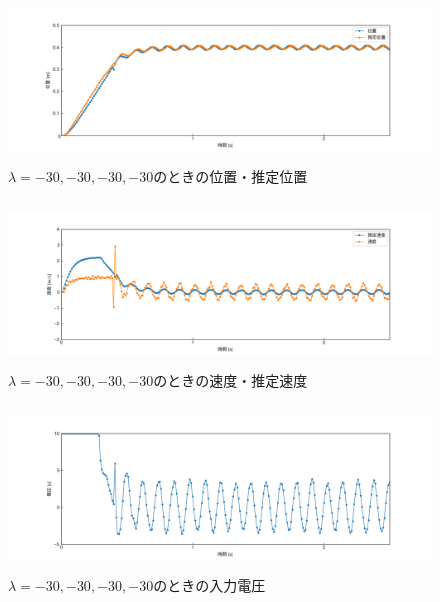 \documentclass[12pt]{jsarticle}
\begin{document}
\begin{figure}[H]
  \begin{center}
    \includegraphics[clip,width=13.0cm, height=4.4cm]{../img/Exp4-1.png}
    \caption{$\lambda=-30, -30, -30, -30$のときの位置・推定位置}
    \label{Exp4-1}
  \end{center}
\end{figure}
\begin{figure}[H]
  \begin{center}
    \includegraphics[clip,width=13.0cm, height=4.4cm]{../img/Exp4-2.png}
    \caption{$\lambda=-30, -30, -30, -30$のときの速度・推定速度}
    \label{Exp4-2}
  \end{center}
\end{figure}
\begin{figure}[H]
  \begin{center}
    \includegraphics[clip,width=13.0cm, height=4.4cm]{../img/Exp4-3.png}
    \caption{$\lambda=-30, -30, -30, -30$のときの入力電圧}
    \label{Exp4-3}
  \end{center}
\end{figure}
\end{document}

